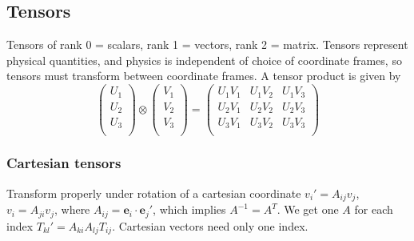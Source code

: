 \documentclass[a4paper, 10pt]{article}
\begin{document}
\begin{multicols*}{3}
\begin{mdframed}
\subsection*{Tensors}
\end{mdframed}
Tensors of rank 0 = scalars, rank 1 = vectors, rank 2 = matrix. Tensors represent physical quantities, and physics is independent of choice of coordinate frames, so tensors must transform between coordinate frames. A tensor product is given by
\[
\left(\begin{matrix}
U_1 \\ U_2 \\ U_3 \\
\end{matrix}\right)
\otimes
\left(\begin{matrix}
V_1 \\ V_2 \\ V_3 \\
\end{matrix}\right)
=
\left(\begin{matrix}
U_1V_1 & U_1V_2 & U_1V_3 \\
U_2V_1 & U_2V_2 & U_2V_3 \\
U_3V_1 & U_3V_2 & U_3V_3 \\
\end{matrix}\right)
\]
\subsubsection*{Cartesian tensors}
Transform properly under rotation of a cartesian coordinate
$v_i' = A_{ij}v_j$, $v_i = A_{ji}v_j$, where $A_{ij} = \bm{e}_i\cdot \bm{e}_j'$, which implies $A^{-1} = A^{T}$. We get one $A$ for each index  $T_{kl}' = A_{ki}A_{lj}T_{ij}$. Cartesian vectors need only one index.

\end{multicols*}
\end{document}
